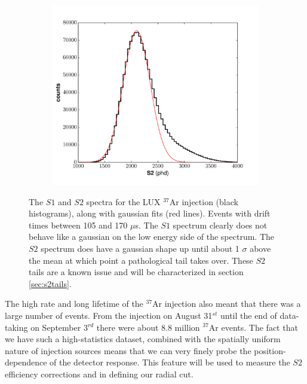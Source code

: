 {\begin{figure}[h!]
\begin{subfigure}{0.5\textwidth}
  \includegraphics[width=\textwidth]{Figures/Ar37_S2spec.pdf}
\end{subfigure}
\caption{The $S1$ and $S2$ spectra for the LUX $^{37}$Ar injection (black histograms), along with gaussian fits (red lines). Events with drift times between 105 and 170 $\mu$s. The $S1$ spectrum clearly does not behave like a gaussian on the low energy side of the spectrum. The $S2$ spectrum does have a  gaussian shape up until about 1 $\sigma$ above the mean at which point a pathological tail takes over. These $S2$ tails are a known issue and will be characterized in section \ref{sec:s2tails}.}
\label{fig:ddplot}
\end{figure}

The high rate and long lifetime of the $^{37}$Ar injection also meant that there was a large number of events. From the injection on August 31$^{st}$ until the end of data-taking on September 3$^{rd}$ there were about 8.8 million $^{37}$Ar events. The fact that we have such a high-statistics dataset, combined with the spatially uniform nature of injection sources means that we can very finely probe the position-dependence of the detector response. This feature will be used to measure the $S2$ efficiency corrections and in defining our radial cut.

}
